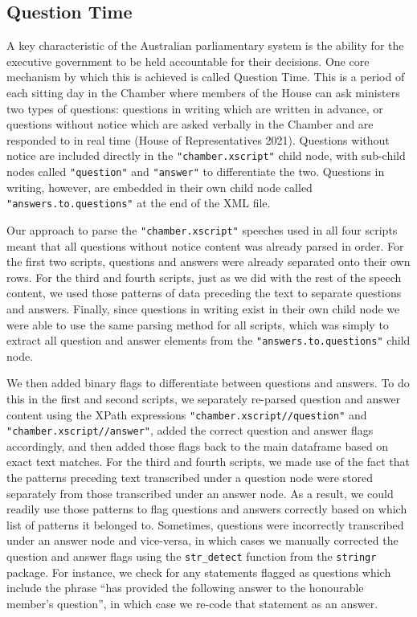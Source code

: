 \documentclass[
  letterpaper,
  DIV=11,
  numbers=noendperiod]{scrartcl}
\begin{document}
\hypertarget{sec-qa}{%
\subsection{Question Time}\label{sec-qa}}

A key characteristic of the Australian parliamentary system is the
ability for the executive government to be held accountable for their
decisions. One core mechanism by which this is achieved is called
Question Time. This is a period of each sitting day in the Chamber where
members of the House can ask ministers two types of questions: questions
in writing which are written in advance, or questions without notice
which are asked verbally in the Chamber and are responded to in real
time (House of Representatives 2021). Questions without notice are
included directly in the \texttt{"chamber.xscript"} child node, with
sub-child nodes called \texttt{"question"} and \texttt{"answer"} to
differentiate the two. Questions in writing, however, are embedded in
their own child node called \texttt{"answers.to.questions"} at the end
of the XML file.

Our approach to parse the \texttt{"chamber.xscript"} speeches used in
all four scripts meant that all questions without notice content was
already parsed in order. For the first two scripts, questions and
answers were already separated onto their own rows. For the third and
fourth scripts, just as we did with the rest of the speech content, we
used those patterns of data preceding the text to separate questions and
answers. Finally, since questions in writing exist in their own child
node we were able to use the same parsing method for all scripts, which
was simply to extract all question and answer elements from the
\texttt{"answers.to.questions"} child node.

We then added binary flags to differentiate between questions and
answers. To do this in the first and second scripts, we separately
re-parsed question and answer content using the XPath expressions
\texttt{"chamber.xscript//question"} and
\texttt{"chamber.xscript//answer"}, added the correct question and
answer flags accordingly, and then added those flags back to the main
dataframe based on exact text matches. For the third and fourth scripts,
we made use of the fact that the patterns preceding text transcribed
under a question node were stored separately from those transcribed
under an answer node. As a result, we could readily use those patterns
to flag questions and answers correctly based on which list of patterns
it belonged to. Sometimes, questions were incorrectly transcribed under
an answer node and vice-versa, in which cases we manually corrected the
question and answer flags using the \texttt{str\_detect} function from
the \texttt{stringr} package. For instance, we check for any statements
flagged as questions which include the phrase ``has provided the
following answer to the honourable member's question'', in which case we
re-code that statement as an answer.
\end{document}
